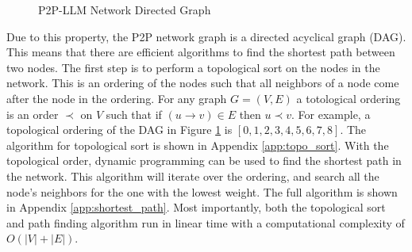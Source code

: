 \documentclass[preprint,twoside,11pt]{article}
\begin{document}
\begin{figure}
	\centering
	\caption{P2P-LLM Network Directed Graph}
	\label{fig:layered_graph}
\end{figure}

Due to this property, the P2P network graph is a directed acyclical graph (DAG). This means that there are efficient
algorithms to find the shortest path between two nodes. The first step is to perform a topological sort on the nodes in the network.
This is an ordering of the nodes such that all neighbors of a node come after the node in the ordering.
For any graph $G = (V, E)$ a totological ordering is an order $\prec$ on $V$ such that if $(u \rightarrow v) \in E$ then $u \prec v$.
For example, a topological ordering of the DAG in Figure \ref{fig:layered_graph} is $[0,1,2,3,4,5,6,7,8]$.
The algorithm for topological sort is shown in Appendix \ref{app:topo_sort}. With the topological order, dynamic programming can be used to find the shortest path in the network.
This algorithm will iterate over the ordering, and search all the node's neighbors for the one with the lowest weight.
The full algorithm is shown in Appendix \ref{app:shortest_path}. Most importantly, both the topological sort and path finding algorithm run in linear time
with a computational complexity of $O(|V| + |E|)$.
\end{document}
